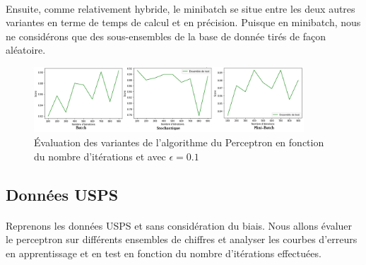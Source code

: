 \documentclass{report}
\begin{document}
\paragraph{}
Ensuite, comme relativement hybride, le minibatch se situe entre les deux autres variantes en terme de temps de calcul et en précision. Puisque en minibatch, nous ne considérons que des sous-ensembles de la base de donnée tirés de façon aléatoire.
 \begin{figure}[H]
	\begin{center}
		\includegraphics[width=0.9\textwidth]{variantes.png}
		\caption{Évaluation des variantes de l'algorithme du Perceptron en fonction du nombre d'itérations et avec $\epsilon=0.1$}
	\end{center}
\end{figure}
\subsection{Données USPS}
\paragraph{}
Reprenons les données USPS et sans considération du biais. Nous allons évaluer le perceptron sur différents ensembles de chiffres et analyser les courbes d'erreurs en apprentissage et en test en fonction du nombre d'itérations effectuées.
\end{document}

